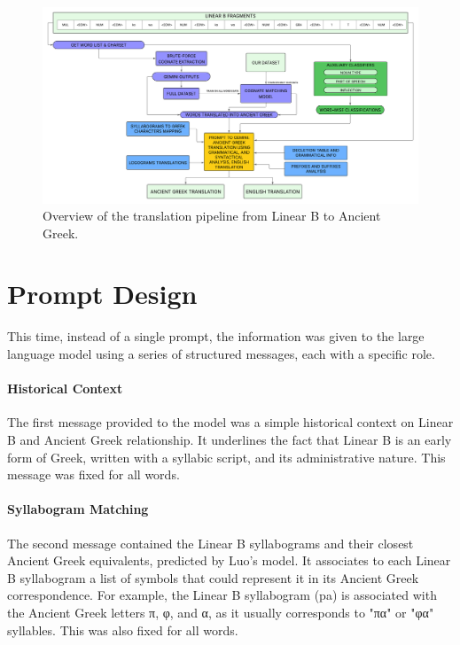 \begin{figure}[H]
    \begin{adjustbox}{center}
        \includegraphics[width=1.2\textwidth]{images/pipeline.png}
    \end{adjustbox}
    \caption{Overview of the translation pipeline from Linear B to Ancient Greek.}
    \label{fig:pipeline}
\end{figure}

\section{Prompt Design} \label{sec:final-prompt}
This time, instead of a single prompt, the information was given to the large language model using a series of structured messages, each with a specific role.

\paragraph{Historical Context}
The first message provided to the model was a simple historical context on Linear B and Ancient Greek relationship.
It underlines the fact that Linear B is an early form of Greek, written with a syllabic script, and its administrative nature.
This message was fixed for all words.

\paragraph{Syllabogram Matching}
The second message contained the Linear B syllabograms and their closest Ancient Greek equivalents, predicted by Luo's model.
It associates to each Linear B syllabogram a list of symbols that could represent it in its Ancient Greek correspondence.
For example, the Linear B syllabogram \textlinb{\Bpa} (pa) is associated with the Ancient Greek letters \textgreek{π}, \textgreek{φ}, and \textgreek{α}, as it usually corresponds to "\textgreek{πα}" or "\textgreek{φα}" syllables.
This was also fixed for all words.


